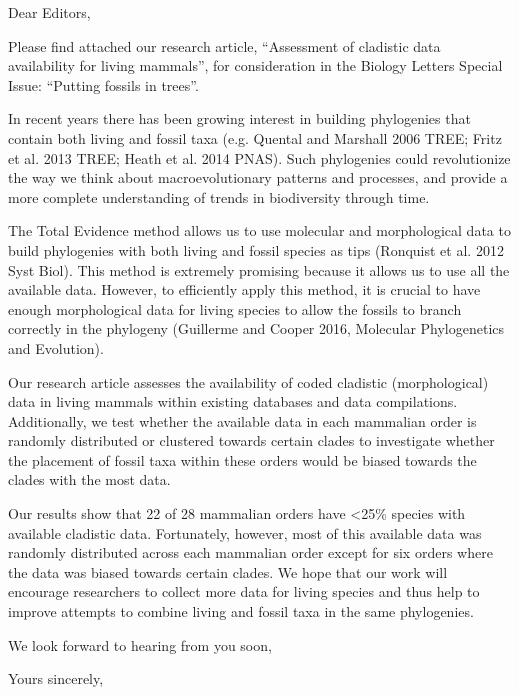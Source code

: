 \documentclass[11pt]{letter}
\begin{document}
\begin{letter}{}
\opening{Dear Editors,}

Please find attached our research article, ``Assessment of cladistic data availability for living mammals'', for consideration in the Biology Letters Special Issue: ``Putting fossils in trees''.


In recent years there has been growing interest in building phylogenies that contain both living and fossil taxa (e.g. Quental and Marshall 2006 TREE; Fritz et al. 2013 TREE; Heath et al. 2014 PNAS).
Such phylogenies could revolutionize the way we think about macroevolutionary patterns and processes, and provide a more complete understanding of trends in biodiversity through time.

The Total Evidence method allows us to use molecular and morphological data to build phylogenies with both living and fossil species as tips (Ronquist et al. 2012 Syst Biol).
This method is extremely promising because it allows us to use all the available data. 
However, to efficiently apply this method, it is crucial to have enough morphological data for living species to allow the fossils to branch correctly in the phylogeny (Guillerme and Cooper 2016, Molecular Phylogenetics and Evolution).

Our research article assesses the availability of coded cladistic (morphological) data in living mammals within existing databases and data compilations.
Additionally, we test whether the available data in each mammalian order is randomly distributed or clustered towards certain clades to investigate whether the placement of fossil taxa within these orders would be biased towards the clades with the most data.

Our results show that 22 of 28 mammalian orders have \textless 25\% species with available cladistic data.
Fortunately, however, most of this available data was randomly distributed across each mammalian order except for six orders where the data was biased towards certain clades.
We hope that our work will encourage researchers to collect more data for living species and thus help to improve attempts to combine living and fossil taxa in the same phylogenies.

We look forward to hearing from you soon,


\closing{Yours sincerely,}


\end{letter}
\end{document}

